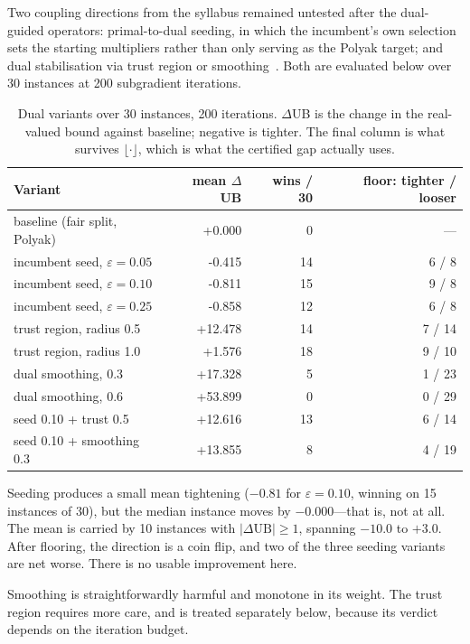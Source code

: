 Two coupling directions from the syllabus remained untested after the dual-guided operators: primal-to-dual seeding, in which the incumbent's own selection sets the starting multipliers rather than only serving as the Polyak target; and dual stabilisation via trust region or smoothing~\cite{DuMerle1999Stabilized}. Both are evaluated below over 30 instances at 200 subgradient iterations.

\begin{table}[htbp]
\centering
\caption{Dual variants over 30 instances, 200 iterations. $\Delta$UB is the change in the real-valued bound against baseline; negative is tighter. The final column is what survives $\lfloor\cdot\rfloor$, which is what the certified gap actually uses.}
\label{tab:variants}
\begin{tabular}{lrrr}
\toprule
Variant & mean $\Delta$UB & wins / 30 & floor: tighter / looser \\
\midrule
baseline (fair split, Polyak) & +0.000 & 0 & --- \\
incumbent seed, $\varepsilon=0.05$ & -0.415 & 14 & 6 / 8 \\
incumbent seed, $\varepsilon=0.10$ & -0.811 & 15 & 9 / 8 \\
incumbent seed, $\varepsilon=0.25$ & -0.858 & 12 & 6 / 8 \\
trust region, radius 0.5 & +12.478 & 14 & 7 / 14 \\
trust region, radius 1.0 & +1.576 & 18 & 9 / 10 \\
dual smoothing, 0.3 & +17.328 & 5 & 1 / 23 \\
dual smoothing, 0.6 & +53.899 & 0 & 0 / 29 \\
seed 0.10 + trust 0.5 & +12.616 & 13 & 6 / 14 \\
seed 0.10 + smoothing 0.3 & +13.855 & 8 & 4 / 19 \\
\bottomrule
\end{tabular}
\end{table}

Seeding produces a small mean tightening ($-0.81$ for $\varepsilon=0.10$, winning on 15 instances of 30), but the median instance moves by $-0.000$---that is, not at all. The mean is carried by 10 instances with $|\Delta \text{UB}|\ge 1$, spanning $-10.0$ to $+3.0$. After flooring, the direction is a coin flip, and two of the three seeding variants are net worse. There is no usable improvement here.

Smoothing is straightforwardly harmful and monotone in its weight. The trust region requires more care, and is treated separately below, because its verdict depends on the iteration budget.
